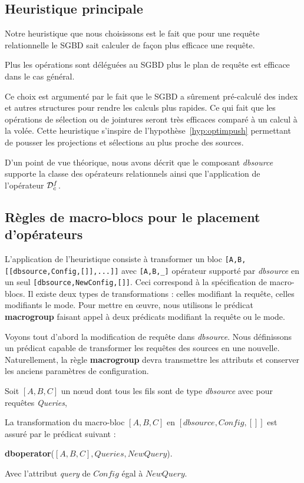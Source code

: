 \subsection{Heuristique principale}
Notre heuristique que nous choisissons est le fait que pour une requête relationnelle le SGBD sait calculer de façon plus efficace une requête. 
\begin{hyp}\label{hyp:sgbd}
    Plus les opérations sont déléguées au SGBD plus le plan de requête est efficace dans le cas général.
\end{hyp}
Ce choix est argumenté par le fait que le SGBD a sûrement pré-calculé des index et autres structures pour rendre les calculs plus rapides. Ce qui fait que les opérations de sélection ou de jointures seront très efficaces comparé à un calcul à la volée. Cette heuristique s'inspire de l'hypothèse~\ref{hyp:optimpush} permettant de pousser les projections et sélections au plus proche des sources.

D'un point de vue théorique, nous avons décrit que le composant \textit{dbsource} supporte la classe des opérateurs relationnels ainsi que l'application de l'opérateur $\mathcal{D}^f_c$. 

\subsection{Règles de macro-blocs pour le placement d'opérateurs}
L'application de l'heuristique consiste à transformer un bloc \lstinline|[A,B,[[dbsource,Config,[]],...]]| avec \lstinline|[A,B,_]| opérateur supporté par \textit{dbsource} en un seul \lstinline|[dbsource,NewConfig,[]]|. Ceci correspond à la spécification de macro-blocs. Il existe deux types de transformations : celles modifiant la requête, celles modifiants le mode. Pour mettre en œuvre, nous utilisons le prédicat \textbf{macrogroup} faisant appel à deux prédicats modifiant la requête ou le mode.

Voyons tout d'abord la modification de requête dans \textit{dbsource}. Nous définissons un prédicat capable de transformer les requêtes des sources en une nouvelle. Naturellement, la règle \textbf{macrogroup} devra transmettre les attributs et conserver les anciens paramètres de configuration.
\begin{regle}
    Soit $[A,B,C]$ un nœud dont tous les fils sont de type \textit{dbsource} avec pour requêtes \textit{Queries},

    La transformation du macro-bloc $[A,B,C]$ en $[dbsource,Config,[]]$ est assuré par le prédicat suivant :
    \begin{center} \textbf{dboperator}($[A,B,C], Queries, NewQuery$). \end{center}
    Avec l'attribut \textit{query} de $Config$ égal à $NewQuery$.
\end{regle}

